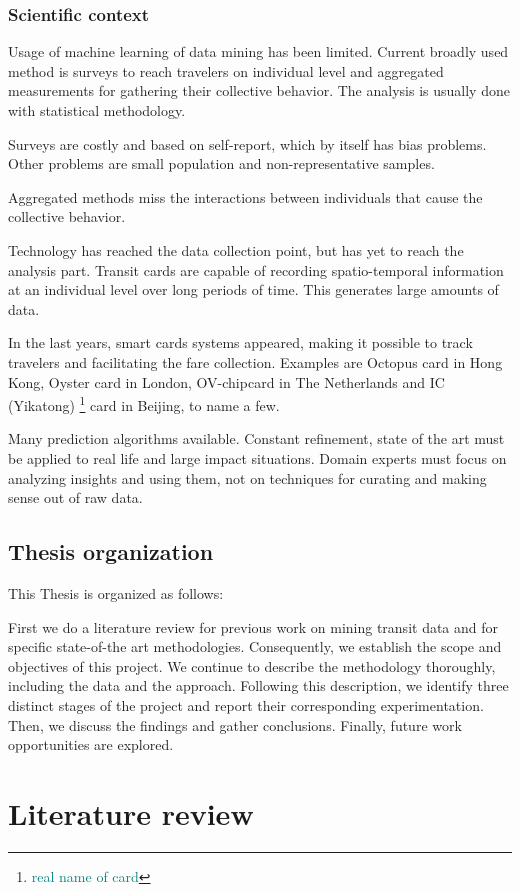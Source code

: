 \documentclass{article}
\newcommand{\domainDoubt}[1]{\footnote{\textcolor{teal}{#1}}}
\begin{document}
\subsubsection{Scientific context}
Usage of machine learning of data mining has been limited. Current broadly used method is surveys to reach travelers on individual level and aggregated measurements for gathering  their collective behavior. The analysis is usually done with statistical methodology. 

Surveys are costly and based on self-report, which by itself has bias problems. Other problems are small population and non-representative samples. 

Aggregated methods miss the interactions between individuals that cause the collective behavior. 

Technology has reached the data collection point, but has yet to reach the analysis part. Transit cards are capable of recording spatio-temporal information at an individual level over long periods of time. This generates large amounts of data. 

In the last years, smart cards systems appeared, making it possible to track travelers and facilitating the fare collection. Examples are Octopus card in Hong Kong, Oyster card in London, OV-chipcard in The Netherlands and IC (Yikatong) \domainDoubt{real name of card} card in Beijing, to name a few.

Many prediction algorithms available. Constant refinement, state of the art must be applied to real life and large impact situations. Domain experts must focus on analyzing insights and using them, not on techniques for curating and making sense out of raw data. 

\subsection{Thesis organization}
This Thesis is organized as follows:

First we do a literature review for previous work on mining transit data and for specific state-of-the art methodologies. Consequently, we establish the scope and objectives of this project. We continue to describe the methodology thoroughly, including the data and the approach. Following this description, we identify three distinct stages of the project and report their corresponding experimentation. Then, we discuss the findings and gather conclusions. Finally, future work opportunities are explored. 


\newpage
\section{Literature review}
\end{document}

